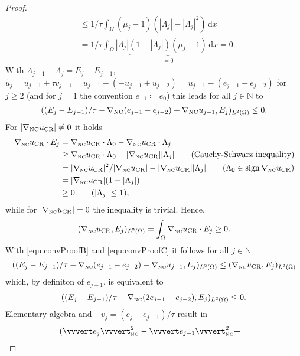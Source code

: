 \begin{proof}
\begin{align*}
    &\leq
    1/\tau \int_\Omega (\mu_j-1)(|\Lambda_j|-|\Lambda_j|^2)\,\mathrm dx\\
    &=
    1/\tau \int_\Omega |\Lambda_j|
    \underbrace{(1-|\Lambda_j|)(\mu_j-1)}_{=0}\,\mathrm dx =0.
  \end{align*}
  With $\Lambda_{j-1}-\Lambda_j=E_j-E_{j-1}$, 
  $\tilde{u}_j=u_{j-1}+\tau v_{j-1}=u_{j-1}-(-u_{j-1}+u_{j-2})=
  u_{j-1}-(e_{j-1}-e_{j-2})$
  for $j\geq 2$ (and for $j=1$ the convention $e_{-1}\coloneqq e_0$)
  this leads for all $j\in \mathbb N$ to
  \begin{align}
    \label{equ:convProofB}
    ( (E_j-E_{j-1})/\tau-\nabla_\textup{NC}(e_{j-1}-e_{j-2})+
    \nabla_\textup{NC}u_{j-1},E_j)_{L^2(\Omega)}\leq 0.
  \end{align}
  For $|\nabla_\textup{NC}u_\textup{CR}|\neq 0$ it holds
  \begin{align*}
    \gradnc\ucr\cdot E_j 
    &=
    \gradnc\ucr\cdot\Lambda_0 - \gradnc\ucr\cdot\Lambda_j\\
    &\geq 
    \gradnc\ucr\cdot\Lambda_0 - |\gradnc\ucr||\Lambda_j| \tag{Cauchy-Schwarz inequality}\\
    &=
    |\gradnc\ucr|^2/|\gradnc\ucr|-|\gradnc\ucr||\Lambda_j| 
    \tag{$\Lambda_0\in\operatorname{sign}\gradnc\ucr$}\\
    &= 
    |\gradnc\ucr|(1-|\Lambda_j|)\\
    &\geq
    0 \tag{$|\Lambda_j|\leq 1$},
  \end{align*}
  while for $|\nabla_{\textup{\tiny NC}}u_{\operatorname{CR}}|=0$ the inequality is trivial.
  Hence,
  \begin{align}
    \label{equ:convProofC}
    (\nabla_{\textup{\tiny NC}}u_{\operatorname{CR}},E_j)_{L^2(\Omega)}=\int_\Omega \nabla_{\textup{\tiny NC}}u_{\operatorname{CR}}\cdot E_j\geq 0.
  \end{align}
  With \eqref{equ:convProofB} and \eqref{equ:convProofC} it follows for all
  $j\in\mathbb N$
  \begin{align*}
    ( (E_j-E_{j-1})/\tau-\nabla_{\textup{\tiny NC}}(e_{j-1}-e_{j-2})+
    \nabla_{\textup{\tiny NC}} u_{j-1},E_j)_{L^2(\Omega)}
    \leq
    (\nabla_{\textup{\tiny NC}}u_{\operatorname{CR}},E_j)_{L^2(\Omega)}
  \end{align*}
  which, by definiton of $e_{j-1}$, is equivalent to
  \begin{align}
    \label{equ:convProofD}
    ( (E_j-E_{j-1})/\tau -\nabla_{\textup{\tiny NC}}(2e_{j-1}-e_{j-2}),E_j)_{L^2(\Omega)}\leq 0.
  \end{align}
  Elementary algebra and $-v_j=(e_j-e_{j-1})/\tau$ result in
  \begin{align*}
    &(\vvvert e_j \vvvert^2_\nc   -
    \vvvert e_{j-1}\vvvert_\nc^2 +

\end{align*}
\end{proof}
